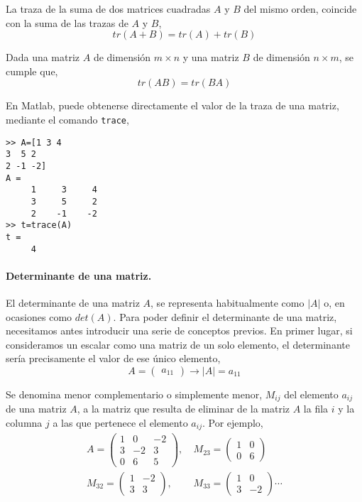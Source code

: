 La traza de la suma de dos matrices cuadradas $A$ y $B$ del mismo orden, coincide con la suma de las trazas de $A$ y $B$,
\begin{equation*}
tr(A+B)=tr(A)+tr(B)
\end{equation*}

Dada una  matriz $A$ de dimensión $m\times n$  y una matriz $B$ de dimensión $n \times m$, se  cumple que,
\begin{equation*}
tr(AB)=tr(BA)
\end{equation*}

En Matlab, puede obtenerse directamente el valor de la traza de una matriz, mediante el comando \texttt{trace},
\begin{verbatim}
>> A=[1 3 4
3  5 2
2 -1 -2]
A =
     1     3     4
     3     5     2
     2    -1    -2
>> t=trace(A)
t =
     4
\end{verbatim}

\paragraph{Determinante de una matriz.} El determinante de una matriz $A$, se representa habitualmente como $\vert A \vert$ o, en ocasiones como $det(A)$. Para poder definir el determinante de una matriz, necesitamos antes introducir una serie de conceptos previos. En primer lugar, si consideramos un escalar como una matriz de un solo elemento, el determinante  sería precisamente el valor de ese único elemento,
\begin{equation*}
A=\begin{pmatrix}
a_{11}
\end{pmatrix} \rightarrow \vert A \vert =a_{11}
\end{equation*}

Se denomina menor complementario o simplemente menor, $M_{ij}$ del elemento $a_{ij}$ de una matriz $A$, a la matriz que resulta de eliminar de la matriz $A$ la fila $i$ y la columna $j$ a las que pertenece el elemento $a_{ij}$. Por ejemplo,
\begin{align*}
A=\begin{pmatrix}
1& 0& -2\\
3& -2& 3\\
0& 6& 5
\end{pmatrix},& \ 
M_{23}=
\begin{pmatrix}
1& 0\\
0& 6
\end{pmatrix}\\
M_{32}=
\begin{pmatrix}
1& -2\\
3& 3
\end{pmatrix},& \ 
M_{33}=
\begin{pmatrix}
1& 0\\
3& -2
\end{pmatrix}\cdots
\end{align*}


